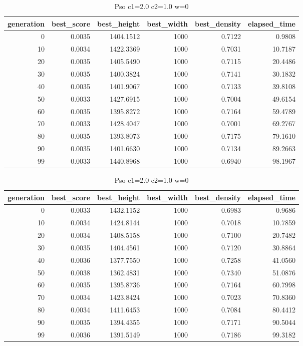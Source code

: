 \begin{table}[htbp]
    \centering
    \caption{Pso c1=2.0 c2=1.0 w=0}
    \label{tab:pso_c1_2_0_c2_1_0_w_0}
    \begin{tabular}{rrrrrr}
    \toprule
    generation & best_score & best_height & best_width & best_density & elapsed_time \\
    \midrule
    0 & 0.0035 & 1404.1512 & 1000 & 0.7122 & 0.9808 \\
    10 & 0.0034 & 1422.3369 & 1000 & 0.7031 & 10.7187 \\
    20 & 0.0035 & 1405.5490 & 1000 & 0.7115 & 20.4486 \\
    30 & 0.0035 & 1400.3824 & 1000 & 0.7141 & 30.1832 \\
    40 & 0.0035 & 1401.9067 & 1000 & 0.7133 & 39.8108 \\
    50 & 0.0033 & 1427.6915 & 1000 & 0.7004 & 49.6154 \\
    60 & 0.0035 & 1395.8272 & 1000 & 0.7164 & 59.4789 \\
    70 & 0.0033 & 1428.4047 & 1000 & 0.7001 & 69.2767 \\
    80 & 0.0035 & 1393.8073 & 1000 & 0.7175 & 79.1610 \\
    90 & 0.0035 & 1401.6630 & 1000 & 0.7134 & 89.2663 \\
    99 & 0.0033 & 1440.8968 & 1000 & 0.6940 & 98.1967 \\
    \bottomrule
    \end{tabular}
\end{table}


\begin{table}[htbp]
    \centering
    \caption{Pso c1=2.0 c2=1.0 w=0}
    \label{tab:pso_c1_2_0_c2_1_0_w_0}
    \begin{tabular}{rrrrrr}
    \toprule
    generation & best_score & best_height & best_width & best_density & elapsed_time \\
    \midrule
    0 & 0.0033 & 1432.1152 & 1000 & 0.6983 & 0.9686 \\
    10 & 0.0034 & 1424.8144 & 1000 & 0.7018 & 10.7859 \\
    20 & 0.0034 & 1408.5158 & 1000 & 0.7100 & 20.7482 \\
    30 & 0.0035 & 1404.4561 & 1000 & 0.7120 & 30.8864 \\
    40 & 0.0036 & 1377.7550 & 1000 & 0.7258 & 41.0560 \\
    50 & 0.0038 & 1362.4831 & 1000 & 0.7340 & 51.0876 \\
    60 & 0.0035 & 1395.8736 & 1000 & 0.7164 & 60.7998 \\
    70 & 0.0034 & 1423.8424 & 1000 & 0.7023 & 70.8360 \\
    80 & 0.0034 & 1411.6453 & 1000 & 0.7084 & 80.4412 \\
    90 & 0.0035 & 1394.4355 & 1000 & 0.7171 & 90.5044 \\
    99 & 0.0036 & 1391.5149 & 1000 & 0.7186 & 99.3182 \\
    \bottomrule
    \end{tabular}
\end{table}


